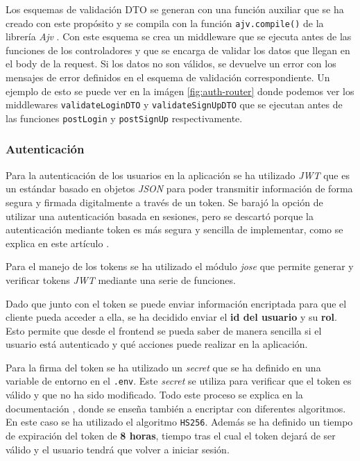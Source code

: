 Los esquemas de validación DTO se generan con una función auxiliar que se ha creado con este
propósito y se compila con la función \texttt{ajv.compile()} de la librería \textit{Ajv}
\cite{ajv-methods}. Con este esquema se crea un middleware que se ejecuta antes de las
funciones de los controladores y que se encarga de validar los datos que llegan en el body
de la request. Si los datos no son válidos, se devuelve un error con los mensajes de error
definidos en el esquema de validación correspondiente. Un ejemplo de esto se puede ver en
la imágen \ref{fig:auth-router} donde podemos ver los middlewares \texttt{validateLoginDTO}
y \texttt{validateSignUpDTO} que se ejecutan antes de las funciones \texttt{postLogin} y
\texttt{postSignUp} respectivamente.

\newpage

\subsubsection{Autenticación} \label{sssec:auth}
Para la autenticación de los usuarios en la aplicación se ha utilizado \textit{JWT}
\cite{jwt} que es un estándar basado en objetos \textit{JSON} para poder transmitir
información de forma segura y firmada digitalmente a través de un token. Se barajó la
opción de utilizar una autenticación basada en sesiones, pero se descartó porque
la autenticación mediante token es más segura y sencilla de implementar, como se
explica en este artículo \cite{token-vs-session}.

Para el manejo de los tokens se ha utilizado el módulo \textit{jose} \cite{jose} que
permite generar y verificar tokens \textit{JWT} \cite{jwt} mediante una serie de funciones.

Dado que junto con el token se puede enviar información encriptada para que el cliente
pueda acceder a ella, se ha decidido enviar el \textbf{id del usuario} y su \textbf{rol}.
Esto permite que desde el frontend se pueda saber de manera sencilla si el usuario está
autenticado y qué acciones puede realizar en la aplicación.

Para la firma del token se ha utilizado un \textit{secret} que se ha definido en una
variable de entorno en el \texttt{.env}. Este \textit{secret} se utiliza para verificar
que el token es válido y que no ha sido modificado. Todo este proceso se explica en la
documentación \cite{jose-sign}, donde se enseña también a encriptar con diferentes
algoritmos. En este caso se ha utilizado el algoritmo \texttt{HS256}. Además se ha
definido un tiempo de expiración del token de \textbf{8 horas}, tiempo tras el cual
el token dejará de ser válido y el usuario tendrá que volver a iniciar sesión.

